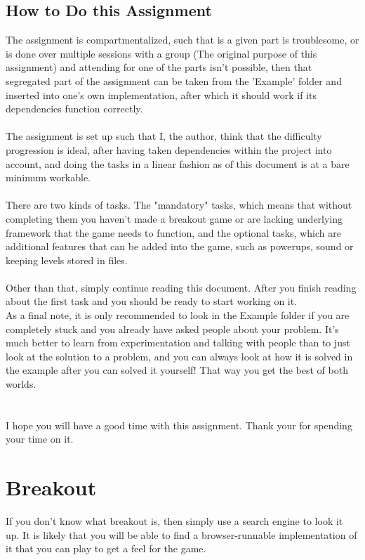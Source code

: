 \documentclass[12pt]{article}
\begin{document}
\subsection{How to Do this Assignment}
The assignment is compartmentalized, such that is a given part is troublesome, or is done over multiple sessions with a group (The original purpose of this assignment) and attending for one of the parts isn't possible, then that segregated part of the assignment can be taken from the 'Example' folder and inserted into one's own implementation, after which it should work if its dependencies function correctly.\\
\\
The assignment is set up such that I, the author, think that the difficulty progression is ideal, after having taken dependencies within the project into account, and doing the tasks in a linear fashion as of this document is at a bare minimum workable.\\
\\
There are two kinds of tasks. The "mandatory" tasks, which means that without completing them you haven't made a breakout game or are lacking underlying framework that the game needs to function, and the optional tasks, which are additional features that can be added into the game, such as powerups, sound or keeping levels stored in files.\\
\\
Other than that, simply continue reading this document. After you finish reading about the first task and you should be ready to start working on it.\\
As a final note, it is only recommended to look in the Example folder if you are completely stuck and you already have asked people about your problem. It's much better to learn from experimentation and talking with people than to just look at the solution to a problem, and you can always look at how it is solved in the example after you can solved it yourself! That way you get the best of both worlds.\\
\\
\\
I hope you will have a good time with this assignment. Thank your for spending your time on it.

\section{Breakout}
If you don't know what breakout is, then simply use a search engine to look it up. It is likely that you will be able to find a browser-runnable implementation of it that you can play to get a feel for the game.

\section{}
\end{document}

